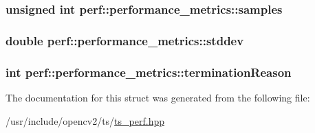 \hypertarget{structperf_1_1performance__metrics_acd73bcfd4dfec164085aaf9a7ad51277}{
\subsubsection[{samples}]{\setlength{\rightskip}{0pt plus 5cm}unsigned int perf\-::performance\-\_\-metrics\-::samples}}\label{structperf_1_1performance__metrics_acd73bcfd4dfec164085aaf9a7ad51277}
\hypertarget{structperf_1_1performance__metrics_a16a37f9f8ce16c12fa74706d4ebad44c}{
\subsubsection[{stddev}]{\setlength{\rightskip}{0pt plus 5cm}double perf\-::performance\-\_\-metrics\-::stddev}}\label{structperf_1_1performance__metrics_a16a37f9f8ce16c12fa74706d4ebad44c}
\hypertarget{structperf_1_1performance__metrics_aa09eac74a010795924bfe8d82bd3509a}{
\subsubsection[{termination\-Reason}]{\setlength{\rightskip}{0pt plus 5cm}int perf\-::performance\-\_\-metrics\-::termination\-Reason}}\label{structperf_1_1performance__metrics_aa09eac74a010795924bfe8d82bd3509a}


The documentation for this struct was generated from the following file\-:\begin{DoxyCompactItemize}
\item 
/usr/include/opencv2/ts/\hyperlink{ts__perf_8hpp}{ts\-\_\-perf.\-hpp}\end{DoxyCompactItemize}
